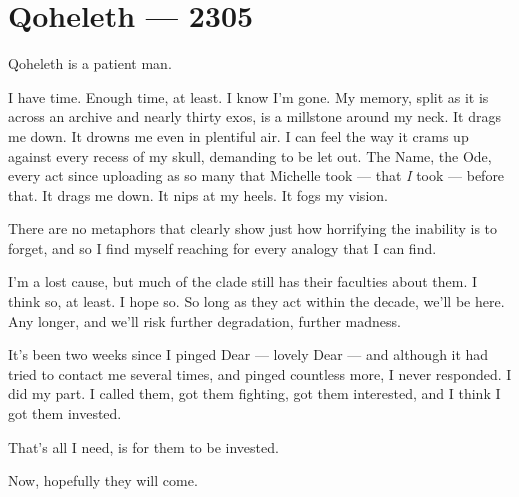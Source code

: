 \hypertarget{qoheleth-2305}{%
\chapter*{Qoheleth — 2305}\label{qoheleth-2305}}

Qoheleth is a patient man.

I have time. Enough time, at least. I know I'm gone. My memory, split as it is across an archive and nearly thirty exos, is a millstone around my neck. It drags me down. It drowns me even in plentiful air. I can feel the way it crams up against every recess of my skull, demanding to be let out. The Name, the Ode, every act since uploading as so many that Michelle took — that \emph{I} took — before that. It drags me down. It nips at my heels. It fogs my vision.

There are no metaphors that clearly show just how horrifying the inability is to forget, and so I find myself reaching for every analogy that I can find.

I'm a lost cause, but much of the clade still has their faculties about them. I think so, at least. I hope so. So long as they act within the decade, we'll be here. Any longer, and we'll risk further degradation, further madness.

It's been two weeks since I pinged Dear — lovely Dear — and although it had tried to contact me several times, and pinged countless more, I never responded. I did my part. I called them, got them fighting, got them interested, and I think I got them invested.

That's all I need, is for them to be invested.

Now, hopefully they will come.
